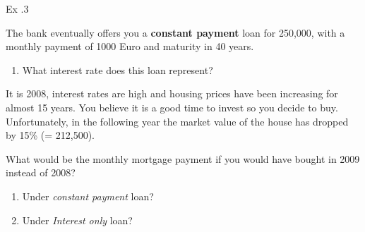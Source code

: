 \documentclass[ignorenonframetext,]{beamer}
\providecommand{\tightlist}{%
\setlength{\itemsep}{0pt}\setlength{\parskip}{0pt}}
\begin{document}
\begin{frame}{Ex .3}

The bank eventually offers you a \textbf{constant payment} loan for
250,000, with a monthly payment of 1000 Euro and maturity in 40 years.

\begin{enumerate}
\def\labelenumi{\arabic{enumi}.}
\tightlist
\item
  What interest rate does this loan represent?
\end{enumerate}

It is 2008, interest rates are high and housing prices have been
increasing for almost 15 years. You believe it is a good time to invest
so you decide to buy. Unfortunately, in the following year the market
value of the house has dropped by 15\% (= 212,500).

What would be the monthly mortgage payment if you would have bought in
2009 instead of 2008?

\begin{enumerate}
\def\labelenumi{\arabic{enumi}.}
\setcounter{enumi}{1}
\tightlist
\item
  Under \emph{constant payment} loan?
\item
  Under \emph{Interest only} loan?
\end{enumerate}

\end{frame}
\end{document}
